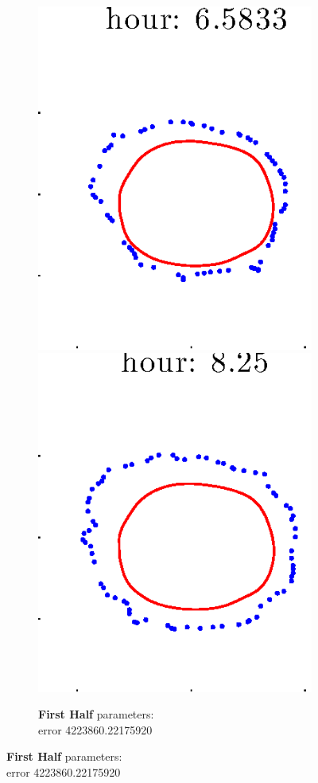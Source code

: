 \documentclass[12pt]{article}
\begin{document}
\begin{figure}[h!]
\begin{subfigure}[b]{.3\textwidth}
		\includegraphics[height=.15\textheight]{Pos10exp2/full/first5.eps}
		\includegraphics[height=.15\textheight]{Pos10exp2/full/first6.eps}
		\caption{\textbf{First Half} parameters: \\error 4223860.22175920}

\end{subfigure}
\end{figure}
\end{document}
